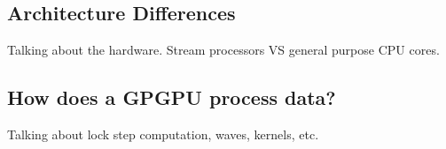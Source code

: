 \subsection*{Architecture Differences}

Talking about the hardware. Stream processors VS general purpose CPU cores.

\subsection*{How does a GPGPU process data?}

Talking about lock step computation, waves, kernels, etc.

